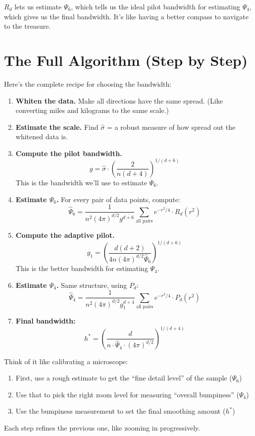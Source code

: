 \documentclass[12pt]{article}
\newcommand{\analogy}[1]{\begin{tcolorbox}[colback=green!5,colframe=green!50!black,title=Analogy]\small #1\end{tcolorbox}}
\newcommand{\whythis}[1]{\begin{tcolorbox}[colback=orange!5,colframe=orange!50!black,title=Why do we need this?]\small #1\end{tcolorbox}}
\begin{document}
\whythis{$R_d$ lets us estimate $\Psi_6$, which tells us the ideal pilot bandwidth for estimating $\Psi_4$, which gives us the final bandwidth. It's like having a better compass to navigate to the treasure.}

\section{The Full Algorithm (Step by Step)}

Here's the complete recipe for choosing the bandwidth:

\begin{enumerate}
\item \textbf{Whiten the data.} Make all directions have the same spread. (Like converting miles and kilograms to the same scale.)

\item \textbf{Estimate the scale.} Find $\hat\sigma$ = a robust measure of how spread out the whitened data is.

\item \textbf{Compute the pilot bandwidth.}
$$g = \hat\sigma \cdot \left(\frac{2}{n(d+4)}\right)^{1/(d+6)}$$
This is the bandwidth we'll use to estimate $\Psi_6$.

\item \textbf{Estimate $\Psi_6$.} For every pair of data points, compute:
$$\hat\Psi_6 = \frac{1}{n^2 (4\pi)^{d/2} g^{d+6}} \sum_{\text{all pairs}} e^{-r^2/4} \cdot R_d(r^2)$$

\item \textbf{Compute the adaptive pilot.}
$$g_1 = \left(\frac{d(d+2)}{4n(4\pi)^{d/2} \hat\Psi_6}\right)^{1/(d+6)}$$
This is the better bandwidth for estimating $\Psi_4$.

\item \textbf{Estimate $\Psi_4$.} Same structure, using $P_d$:
$$\hat\Psi_4 = \frac{1}{n^2 (4\pi)^{d/2} g_1^{d+4}} \sum_{\text{all pairs}} e^{-r^2/4} \cdot P_d(r^2)$$

\item \textbf{Final bandwidth:}
$$h^* = \left(\frac{d}{n \cdot \hat\Psi_4 \cdot (4\pi)^{d/2}}\right)^{1/(d+4)}$$
\end{enumerate}

\analogy{
Think of it like calibrating a microscope:
\begin{enumerate}
\item First, use a rough estimate to get the ``fine detail level'' of the sample ($\Psi_6$)
\item Use that to pick the right zoom level for measuring ``overall bumpiness'' ($\Psi_4$)
\item Use the bumpiness measurement to set the final smoothing amount ($h^*$)
\end{enumerate}
Each step refines the previous one, like zooming in progressively.}
\end{document}
